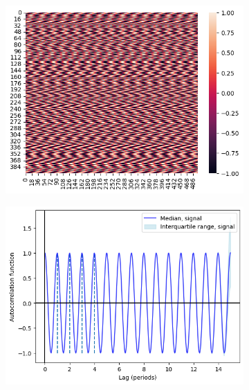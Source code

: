 \begin{figure}
  \centering
  \begin{subfigure}[t]{0.45\textwidth}
  \centering
    \includegraphics[width=\linewidth]{sinusoids_outofphase}
    \caption{
    }
    \label{fig:acf-sinusoids-nonoise-ts}
  \end{subfigure}%
  \centering
  \begin{subfigure}[t]{0.4\textwidth}
  \centering
    \includegraphics[width=\linewidth]{sinusoids_outofphase_acf_corrected}
    \caption{
    }
    \label{fig:acf-sinusoids-nonoise-acf}
  \end{subfigure}


\end{figure}
